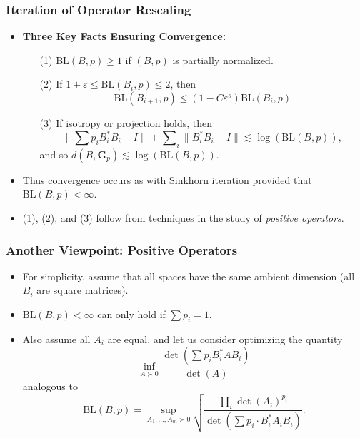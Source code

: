\documentclass[handout,usenames,dvipsnames,12pt]{beamer}
\begin{document}
\begin{frame}
    \frametitle{Iteration of Operator Rescaling}

    \begin{itemize}
        \item {\bf Three Key Facts Ensuring Convergence:}
        \begin{itemize}
            \pause
            \item[(1)] $\text{BL}(B,p) \geq 1$ if $(B,p)$ is partially normalized.
            \pause
            \item[(2)] If $1 + \varepsilon \leq \text{BL}(B_i,p) \leq 2$, then
            \[ \text{BL}(B_{i+1},p) \leq (1 - C \varepsilon^s) \text{BL}(B_i,p) \]

            \pause
            \item[(3)] If isotropy or projection holds, then
            \[ \| \sum p_i B_i^* B_i - I \| + \sum\nolimits_i \| B_i^* B_i - I \| \lesssim \log(\text{BL}(B,p)), \]
            and so $d(B,\mathbf{G}_p) \lesssim \log(\text{BL}(B,p))$.
        \end{itemize}

        \pause
        \item Thus convergence occurs as with Sinkhorn iteration provided that $\text{BL}(B,p) < \infty$.

        \pause
        \item (1), (2), and (3) follow from techniques in the study of \emph{positive operators}.
    \end{itemize}

\end{frame}


\begin{frame}
    \frametitle{Another Viewpoint: Positive Operators}

    \begin{itemize}
        \item For simplicity, assume that all spaces have the same ambient dimension (all $B_i$ are square matrices). 

        \pause
        \item $\text{BL}(B,p) < \infty$ can only hold if $\sum p_i = 1$.

        \pause
        \item Also assume all $A_i$ are equal, and let us consider optimizing the quantity
        \[ \inf_{A \succ 0} \frac{\det(\sum p_i B_i^* A B_i)}{\det(A)}  \]
        analogous to
        \[ \text{BL}(B,p) = \sup_{A_1,\dots,A_m \succ 0} \sqrt{ \frac{\prod_i \det(A_i)^{p_i}}{\det(\sum p_i \cdot B_i^* A_i B_i)}}. \]
    \end{itemize}
\end{frame}
\end{document}
